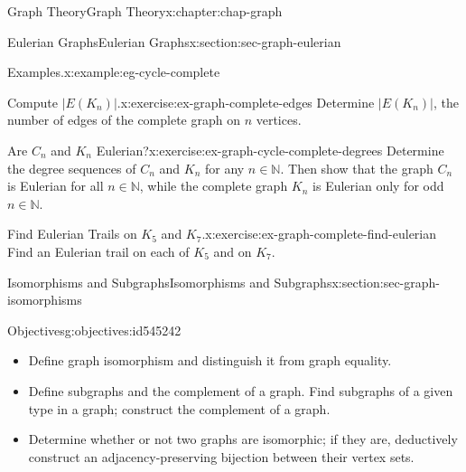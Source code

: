 \documentclass[oneside,10pt,]{book}
\numberwithin{equation}{section}
\begin{document}
\begin{chapterptx}{Graph Theory}{}{Graph Theory}{}{}{x:chapter:chap-graph}
\begin{sectionptx}{Eulerian Graphs}{}{Eulerian Graphs}{}{}{x:section:sec-graph-eulerian}
\begin{example}{Examples.}{x:example:eg-cycle-complete}
\begin{sidebyside}{4}{0.035}{0.035}{0.07}
\begin{sbspanel}{0.2}
{
}%
\end{sbspanel}%
\end{sidebyside}%
\end{example}
\begin{inlineexercise}{Compute \(|E(K_n)|\).}{x:exercise:ex-graph-complete-edges}%
Determine \(|E(K_n)|\), the number of edges of the complete graph on \(n\) vertices.%
\end{inlineexercise}%
\begin{inlineexercise}{Are \(C_n\) and \(K_n\) Eulerian?}{x:exercise:ex-graph-cycle-complete-degrees}%
Determine the degree sequences of \(C_n\) and \(K_n\) for any \(n \in \mathbb{N}\). Then show that the graph \(C_n\) is Eulerian for all \(n \in \mathbb{N}\), while the complete graph \(K_n\) is Eulerian only for odd \(n \in \mathbb{N}\).%
\end{inlineexercise}%
\begin{inlineexercise}{Find Eulerian Trails on \(K_5\) and \(K_7\).}{x:exercise:ex-graph-complete-find-eulerian}%
Find an Eulerian trail on each of \(K_5\) and on \(K_7\).%
\end{inlineexercise}%
\end{sectionptx}
%
%
\typeout{************************************************}
\typeout{************************************************}
%
\begin{sectionptx}{Isomorphisms and Subgraphs}{}{Isomorphisms and Subgraphs}{}{}{x:section:sec-graph-isomorphisms}
\begin{objectives}{Objectives}{g:objectives:id545242}
%
\begin{itemize}[label=\textbullet]
\item{}Define graph isomorphism and distinguish it from graph equality.%
\item{}Define subgraphs and the complement of a graph. Find subgraphs of a given type in a graph; construct the complement of a graph.%
\item{}Determine whether or not two graphs are isomorphic; if they are, deductively construct an adjacency-preserving bijection between their vertex sets.%

\end{itemize}
\end{objectives}
\end{sectionptx}
\end{chapterptx}
\end{document}
